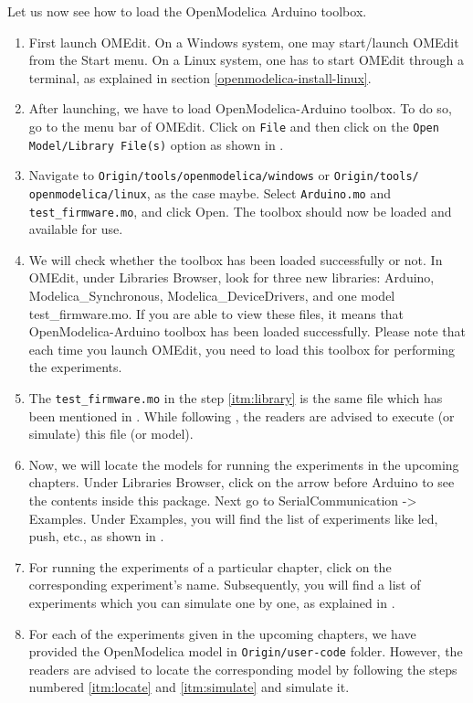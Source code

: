 Let us now see how to load the OpenModelica Arduino toolbox. 
\begin{enumerate}
      \item First launch OMEdit. On a Windows system, one may start/launch
            OMEdit from the Start menu. On a Linux system, one has to
            start OMEdit through a terminal, as
            explained in section \ref{openmodelica-install-linux}.
      \item After launching, we have to load OpenModelica-Arduino
            toolbox. To do so, go to the menu bar of OMEdit. 
            Click on {\tt File} and then click on
            the {\tt Open Model/Library File(s)} option as shown in .
      \item Navigate to {\tt Origin/tools/openmodelica/windows} or {\tt Origin/tools/\\openmodelica/linux}, as the case maybe.
            Select {\tt Arduino.mo} and \\{\tt test\_firmware.mo}, and click Open. The toolbox should now be loaded and available for use. 
      \item \label{itm:library} We will check whether the toolbox has been loaded successfully or not. 
            In OMEdit, under Libraries Browser, look for three new libraries: Arduino,
            Modelica\_Synchronous, Modelica\_DeviceDrivers, and one model test\_firmware.mo. 
            If you are able to view these files, it means that OpenModelica-Arduino toolbox has been loaded successfully. 
            Please note that each time you launch OMEdit, you need to load this toolbox for
            performing the experiments. 
      \item The {\tt test\_firmware.mo} in the step \ref{itm:library} is the same file which has been mentioned in .
            While following , the readers are advised to execute (or simulate) this file (or model). 
      \item \label{itm:locate} Now, we will locate the models for running the experiments in the upcoming chapters. 
            Under Libraries Browser, click on the arrow before Arduino to see the 
            contents inside this package. Next go to SerialCommunication -> Examples. 
            Under Examples, you will find the list of experiments like led, push, etc., 
            as shown in .
      \item \label{itm:simulate} For running the experiments of a particular chapter, click on the corresponding 
            experiment's name. Subsequently, you will find a list of experiments which you can 
            simulate one by one, as explained in .
      \item For each of the experiments given in the upcoming chapters, we have provided 
            the OpenModelica model in {\tt Origin/user-code} folder. However, the readers 
            are advised to locate the corresponding model by following the steps
             numbered \ref{itm:locate} and \ref{itm:simulate} and simulate it.  
\end{enumerate}



